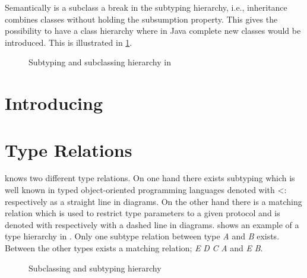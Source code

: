 Semantically is a subclass a break in the subtyping hierarchy, i.e., inheritance
combines classes without holding the subsumption property. This gives \ooplss
the possibility to have a class hierarchy where in Java complete new classes
would be introduced. This is illustrated in \cref{fig:inheritHierarchy}.

%


\begin{figure}
	\centering
	\caption{Subtyping and subclassing hierarchy in \ooplss}
	\label{fig:inheritHierarchy}
\end{figure}

\section{Introducing \mytype}

\section{Type Relations}
\ooplss knows two different type relations. On one hand there exists
subtyping which is well known in typed object-oriented programming
languages denoted with <: respectively as a straight line in diagrams. On
the other hand there is a matching relation which is used to restrict type
parameters to a given protocol and is denoted with \match respectively
with a dashed line in diagrams.  shows an example of
a type hierarchy in \ooplss. Only one subtype relation between type \emph{A}
and \emph{B} exists. Between the other types exists a matching relation; \emph{E}
\match \emph{D} \match \emph{C} \match \emph{A} and \emph{E} \match \emph{B}.


\begin{figure}[h]
	\centering
	\caption{Subclassing and subtyping hierarchy}
	\label{fig:hierarchy}
\end{figure}

